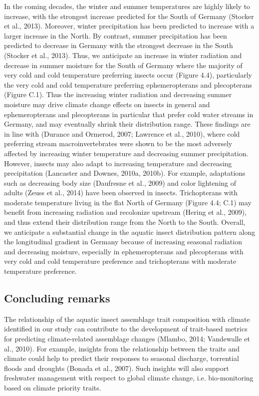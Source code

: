 In the coming decades, the winter and summer temperatures are highly likely to increase, with the strongest increase predicted for the South of Germany (Stocker et al., 2013). Moreover, winter precipitation has been predicted to increase with a larger increase in the North. By contrast, summer precipitation has been predicted to decrease in Germany with the strongest decrease in the South (Stocker et al., 2013). Thus, we anticipate an increase in winter radiation and decrease in summer moisture for the South of Germany where the majority of very cold and cold temperature preferring insects occur (Figure 4.4), particularly the very cold and cold temperature preferring ephemeropterans and plecopterans (Figure C.1). Thus the increasing winter radiation and decreasing summer moisture may drive climate change effects on insects in general and ephemeropterans and plecopterans in particular that prefer cold water streams in Germany, and may eventually shrink their distribution range. These findings are in line with (Durance and Ormerod, 2007; Lawrence et al., 2010), where cold preferring stream macroinvertebrates were shown to be the most adversely affected by increasing winter temperature and decreasing summer precipitation. However, insects may also adapt to increasing temperature and decreasing precipitation (Lancaster and Downes, 2010a, 2010b). For example, adaptations such as decreasing body size (Daufresne et al., 2009) and color lightening of adults (Zeuss et al., 2014) have been observed in insects. Trichopterans with moderate temperature living in the flat North of Germany (Figure 4.4; C.1) may benefit from increasing radiation and recolonize upstream (Hering et al., 2009), and thus extend their distribution range from the North to the South. Overall, we anticipate a substantial change in the aquatic insect distribution pattern along the longitudinal gradient in Germany because of increasing seasonal radiation and decreasing moisture, especially in ephemeropterans and plecopterans with very cold and cold temperature preference and trichopterans with moderate temperature preference.

\subsection{Concluding remarks}
\label{Concluding remarks}

The relationship of the aquatic insect assemblage trait composition with climate identified in our study can contribute to the development of trait-based metrics for predicting climate-related assemblage changes (Mlambo, 2014; Vandewalle et al., 2010). For example, insights from the relationship between the traits and climate could help to predict their responses to seasonal discharge, torrential floods and droughts (Bonada et al., 2007). Such insights will also support freshwater management with respect to global climate change, i.e. bio-monitoring based on climate priority traits.

